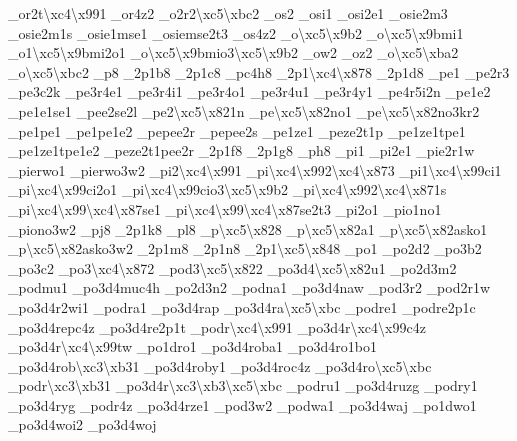\begin{DoxyCompactItemize}
\-\_\-or2t\textbackslash{}xc4\textbackslash{}x991 \-\_\-or4z2 \-\_\-o2r2\textbackslash{}xc5\textbackslash{}xbc2 \-\_\-os2 \-\_\-osi1 \-\_\-osi2e1 \-\_\-osie2m3 \-\_\-osie2m1s \-\_\-osie1mse1 \-\_\-osiemse2t3 \-\_\-os4z2 \-\_\-o\textbackslash{}xc5\textbackslash{}x9b2 \-\_\-o\textbackslash{}xc5\textbackslash{}x9bmi1 \-\_\-o1\textbackslash{}xc5\textbackslash{}x9bmi2o1 \-\_\-o\textbackslash{}xc5\textbackslash{}x9bmio3\textbackslash{}xc5\textbackslash{}x9b2 \-\_\-ow2 \-\_\-oz2 \-\_\-o\textbackslash{}xc5\textbackslash{}xba2 \-\_\-o\textbackslash{}xc5\textbackslash{}xbc2 \-\_\-p8 \-\_\-2p1b8 \-\_\-2p1c8 \-\_\-pc4h8 \-\_\-2p1\textbackslash{}xc4\textbackslash{}x878 \-\_\-2p1d8 \-\_\-pe1 \-\_\-pe2r3 \-\_\-pe3c2k \-\_\-pe3r4e1 \-\_\-pe3r4i1 \-\_\-pe3r4o1 \-\_\-pe3r4u1 \-\_\-pe3r4y1 \-\_\-pe4r5i2n \-\_\-pe1e2 \-\_\-pe1e1se1 \-\_\-pee2se2l \-\_\-pe2\textbackslash{}xc5\textbackslash{}x821n \-\_\-pe\textbackslash{}xc5\textbackslash{}x82no1 \-\_\-pe\textbackslash{}xc5\textbackslash{}x82no3kr2 \-\_\-pe1pe1 \-\_\-pe1pe1e2 \-\_\-pepee2r \-\_\-pepee2s \-\_\-pe1ze1 \-\_\-peze2t1p \-\_\-pe1ze1tpe1 \-\_\-pe1ze1tpe1e2 \-\_\-peze2t1pee2r \-\_\-2p1f8 \-\_\-2p1g8 \-\_\-ph8 \-\_\-pi1 \-\_\-pi2e1 \-\_\-pie2r1w \-\_\-pierwo1 \-\_\-pierwo3w2 \-\_\-pi2\textbackslash{}xc4\textbackslash{}x991 \-\_\-pi\textbackslash{}xc4\textbackslash{}x992\textbackslash{}xc4\textbackslash{}x873 \-\_\-pi1\textbackslash{}xc4\textbackslash{}x99ci1 \-\_\-pi\textbackslash{}xc4\textbackslash{}x99ci2o1 \-\_\-pi\textbackslash{}xc4\textbackslash{}x99cio3\textbackslash{}xc5\textbackslash{}x9b2 \-\_\-pi\textbackslash{}xc4\textbackslash{}x992\textbackslash{}xc4\textbackslash{}x871s \-\_\-pi\textbackslash{}xc4\textbackslash{}x99\textbackslash{}xc4\textbackslash{}x87se1 \-\_\-pi\textbackslash{}xc4\textbackslash{}x99\textbackslash{}xc4\textbackslash{}x87se2t3 \-\_\-pi2o1 \-\_\-pio1no1 \-\_\-piono3w2 \-\_\-pj8 \-\_\-2p1k8 \-\_\-pl8 \-\_\-p\textbackslash{}xc5\textbackslash{}x828 \-\_\-p\textbackslash{}xc5\textbackslash{}x82a1 \-\_\-p\textbackslash{}xc5\textbackslash{}x82asko1 \-\_\-p\textbackslash{}xc5\textbackslash{}x82asko3w2 \-\_\-2p1m8 \-\_\-2p1n8 \-\_\-2p1\textbackslash{}xc5\textbackslash{}x848 \-\_\-po1 \-\_\-po2d2 \-\_\-po3b2 \-\_\-po3c2 \-\_\-po3\textbackslash{}xc4\textbackslash{}x872 \-\_\-pod3\textbackslash{}xc5\textbackslash{}x822 \-\_\-po3d4\textbackslash{}xc5\textbackslash{}x82u1 \-\_\-po2d3m2 \-\_\-podmu1 \-\_\-po3d4muc4h \-\_\-po2d3n2 \-\_\-podna1 \-\_\-po3d4naw \-\_\-pod3r2 \-\_\-pod2r1w \-\_\-po3d4r2wi1 \-\_\-podra1 \-\_\-po3d4rap \-\_\-po3d4ra\textbackslash{}xc5\textbackslash{}xbc \-\_\-podre1 \-\_\-podre2p1c \-\_\-po3d4repc4z \-\_\-po3d4re2p1t \-\_\-podr\textbackslash{}xc4\textbackslash{}x991 \-\_\-po3d4r\textbackslash{}xc4\textbackslash{}x99c4z \-\_\-po3d4r\textbackslash{}xc4\textbackslash{}x99tw \-\_\-po1dro1 \-\_\-po3d4roba1 \-\_\-po3d4ro1bo1 \-\_\-po3d4rob\textbackslash{}xc3\textbackslash{}xb31 \-\_\-po3d4roby1 \-\_\-po3d4roc4z \-\_\-po3d4ro\textbackslash{}xc5\textbackslash{}xbc \-\_\-podr\textbackslash{}xc3\textbackslash{}xb31 \-\_\-po3d4r\textbackslash{}xc3\textbackslash{}xb3\textbackslash{}xc5\textbackslash{}xbc \-\_\-podru1 \-\_\-po3d4ruzg \-\_\-podry1 \-\_\-po3d4ryg \-\_\-podr4z \-\_\-po3d4rze1 \-\_\-pod3w2 \-\_\-podwa1 \-\_\-po3d4waj \-\_\-po1dwo1 \-\_\-po3d4woi2 \-\_\-po3d4woj 
\end{DoxyCompactItemize}
